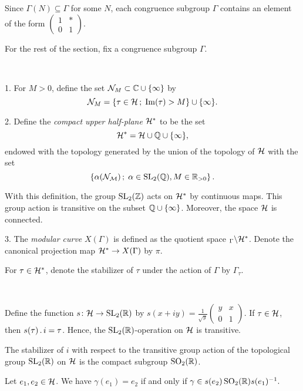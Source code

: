 \begin{rmk} \label{pr:smallest-h}
 Since $\Gamma(N)\subseteq\Gamma$ for some $N$, each congruence subgroup $\Gamma$ contains an element of the form $\left(\begin{smallmatrix}1 & *\\0 & 1\end{smallmatrix}\right)$.
\end{rmk}

For the rest of the section, fix a congruence subgroup $\Gamma$.

\begin{defi} \ 

  1. For $M>0$, define the set $\mathcal{N}_M \subset \mathbb{C}\cup\{\infty\}$ by
  \[\mathcal{N}_M=\left\{\tau\in\mathcal{H}\,;\; \operatorname{Im}(\tau)>M\right\}\cup\{\infty\}.\]

  2. Define the \emph{compact upper half-plane} $\mathcal{H}^*$ to be the set
  \[\mathcal{H}^*=\mathcal{H}\cup\mathbb{Q}\cup\{\infty\},\]
  endowed with the topology generated by the union of the topology of $\mathcal{H}$ with the set
  \[\left\{\alpha(\mathcal{N_M})\,;\; \alpha\in\operatorname{SL}_2(\mathbb{Q}), M\in\mathbb{R}_{>0}\right\}.\]

  With this definition, the group $\operatorname{SL}_2(\mathbb{Z})$ acts on $\mathcal{H}^*$ by continuous maps. This group action is transitive on the subset $\mathbb{Q}\cup\{\infty\}$. Moreover, the space $\mathcal{H}$ is connected.

  3. The \emph{modular curve} $X(\Gamma)$ is defined as the quotient space $_\Gamma\backslash\mathcal{H}^*$. Denote the canonical projection map $\mathcal{H}^*\to X(\Gamma)$ by $\pi$.
\end{defi}

For $\tau\in\mathcal{H}^*$, denote the stabilizer of $\tau$ under the action of $\Gamma$ by $\Gamma_\tau$.

\begin{rmk}\label{pr:real-op} \ 

  Define the function $s\colon\mathcal{H}\to\operatorname{SL}_2(\mathbb{R})$ by $s(x+iy)=\frac{1}{\sqrt{y}}\left(\begin{smallmatrix}y & x \\ 0 & 1\end{smallmatrix}\right)$. If $\tau\in\mathcal{H}$, then $s(\tau)\,.\, i=\tau$. Hence, the $\operatorname{SL}_2(\mathbb{R})$-operation on $\mathcal{H}$ is transitive.
 
  The stabilizer of $i$ with respect to the transitive group action of the topological group $\operatorname{SL}_2(\mathbb{R})$ on $\mathcal{H}$ is the compact subgroup $\operatorname{SO}_2(\mathbb{R})$.
 
  Let $e_1,e_2\in\mathcal{H}$. We have $\gamma(e_1)=e_2$ if and only if $\gamma\in s(e_2)\operatorname{SO}_2(\mathbb{R})s(e_1)^{-1}.$
\end{rmk}

